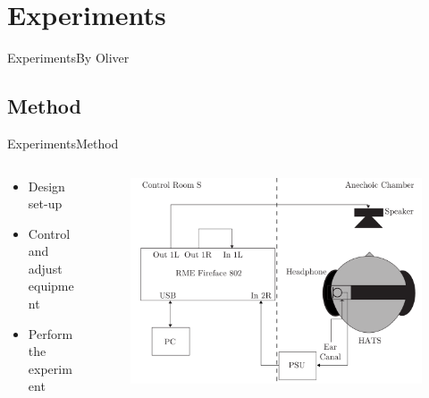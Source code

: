 \section{Experiments}

\begin{frame}{Experiments}{By Oliver}
\end{frame}

\subsection{Method}
\begin{frame}{Experiments}{Method}		
	\begin{columns}
		\begin{column}{0.5\textwidth}
			\begin{itemize}
				\item Design set-up
				\item Control and adjust equipment
				\item Perform the experiment
			\end{itemize}	
		\end{column}
		\begin{column}{0.5\textwidth} 
			\begin{figure}
				\includegraphics[width=1\textwidth]{figures/SetupDiagram.pdf}
			\end{figure}
		\end{column}
	\end{columns}
\end{frame}

